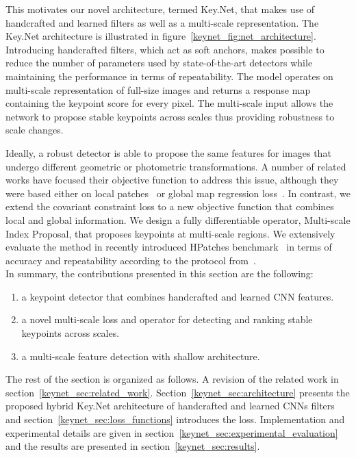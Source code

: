 This motivates our novel architecture, termed Key.Net, that makes use of handcrafted and learned filters as well as a multi-scale representation. 
The Key.Net architecture is illustrated in figure~\ref{keynet_fig:net_architecture}. Introducing handcrafted filters, which act as soft anchors, makes possible to reduce the number of parameters used by state-of-the-art detectors while maintaining the performance in terms of repeatability. The model operates on multi-scale representation of full-size images and returns a response map containing the keypoint score for every pixel. The multi-scale input allows the network to propose stable keypoints across scales thus providing robustness to scale changes. 

Ideally, a robust detector is able to propose the same features for images that undergo different geometric or photometric transformations. A number of related works have focused their objective function to address this issue, although they were based either on local patches~\cite{Karel_Vedaldi_ECCV_16, Zhang_Felix_CVPR_17} or global map regression loss~\cite{detone2017superpoint, TILDE, OnoSerra18}. In contrast, we extend the covariant constraint loss to a new objective function that combines local and global information. We design a fully differentiable operator, Multi-scale Index Proposal, that proposes keypoints at multi-scale regions. We extensively evaluate the method in recently introduced HPatches benchmark~\cite{HPatches} in terms of accuracy and repeatability according to the protocol from~\cite{mikolajczykpami2005}.\\

\noindent In summary, the contributions presented in this section are the following:

\begin{enumerate}
    \item a keypoint detector that combines handcrafted and learned CNN features.
    \item a novel multi-scale loss and operator for detecting and ranking stable keypoints across scales.
    \item a multi-scale feature detection with shallow architecture.
\end{enumerate}

\noindent The rest of the section is organized as follows. A revision of the related work in section~\ref{keynet_sec:related_work}. Section~\ref{keynet_sec:architecture} presents the proposed hybrid Key.Net architecture of handcrafted and learned CNNs filters and section~\ref{keynet_sec:loss_functions} introduces the loss. Implementation and experimental details are given in section~\ref{keynet_sec:experimental_evaluation} and the results are presented in section~\ref{keynet_sec:results}.

